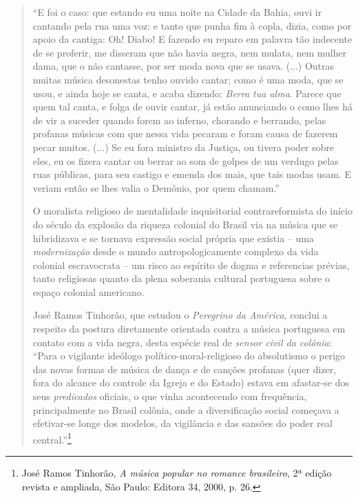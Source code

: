 \begin{quote}
``E foi o caso: que estando eu uma noite na Cidade da Bahia, ouvi ir
cantando pela rua uma voz: e tanto que punha fim à copla, dizia, como
por apoio da cantiga: Oh! Diabo! E fazendo eu reparo em palavra tão
indecente de se proferir, me disseram que não havia negra, nem mulata,
nem mulher dama, que o não cantasse, por ser moda nova que se usava.
(...) Outras muitas música desonestas tenho ouvido cantar; como é uma
moda, que se usou, e ainda hoje se canta, e acaba dizendo: \emph{Berra
tua alma}. Parece que quem tal canta, e folga de ouvir cantar, já estão
anunciando o como lhes há de vir a suceder quando forem ao inferno,
chorando e berrando, pelas profanas músicas com que nessa vida pecaram e
foram causa de fazerem pecar muitos. (...) Se eu fora ministro da
Justiça, ou tivera poder sobre eles, eu os fizera cantar ou berrar ao
som de golpes de um verdugo pelas ruas públicas, para seu castigo e
emenda dos mais, que tais modas usam. E veriam então se lhes valia o
Demônio, por quem chamam.''

O moralista religioso de mentalidade inquisitorial contrareformista do
início do século da explosão da riqueza colonial do Brasil via na música
que se hibridizava e se tornava expressão social própria que existia --
uma \emph{modernização} desde o mundo antropologicamente complexo da
vida colonial escravocrata -- um risco ao espírito de dogma e
referencias prévias, tanto religiosas quanto da plena soberania cultural
portuguesa sobre o espaço colonial americano.

José Ramos Tinhorão, que estudou o \emph{Peregrino da América}, conclui
a respeito da postura diretamente orientada contra a música portuguesa
em contato com a vida negra, desta espécie real de \emph{sensor civil da
colônia}: ``Para o vigilante ideólogo político-moral-religioso do
absolutismo o perigo das novas formas de música de dança e de canções
profanas (quer dizer, fora do alcance do controle da Igreja e do Estado)
estava em afastar-se dos seus \emph{predicados} oficiais, o que vinha
acontecendo com frequência, principalmente no Brasil colônia, onde a
diversificação social começava a efetivar-se longe dos modelos, da
vigilância e das sansões do poder real central.''\footnote{José Ramos
  Tinhorão, \emph{A música popular no romance brasileiro}, 2ª edição
  revista e ampliada, São Paulo: Editora 34, 2000, p. 26.}


\end{quote}
